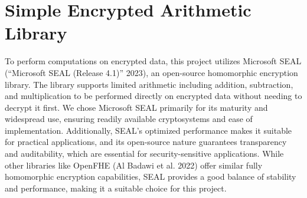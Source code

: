 \section{Simple Encrypted Arithmetic Library}

To perform computations on encrypted data, this project utilizes Microsoft SEAL (“Microsoft SEAL (Release 4.1)” 2023), an open-source homomorphic encryption library. The library supports limited arithmetic including addition, subtraction, and multiplication to be performed directly on encrypted data without needing to decrypt it first. We chose Microsoft SEAL primarily for its maturity and widespread use, ensuring readily available cryptosystems and ease of implementation. Additionally, SEAL's optimized performance makes it suitable for practical applications, and its open-source nature guarantees transparency and auditability, which are essential for security-sensitive applications. While other libraries like OpenFHE (Al Badawi et al. 2022) offer similar fully homomorphic encryption capabilities, SEAL provides a good balance of stability and performance, making it a suitable choice for this project.

